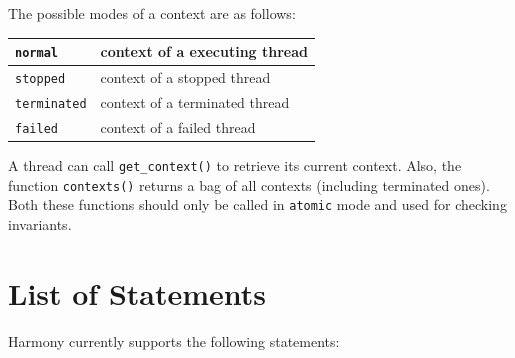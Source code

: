 \documentclass{report}
\begin{document}
The possible modes of a context are as follows:

\begin{center}
\begin{tabular}{|l|l|}
\hline
\texttt{normal} & context of a executing thread \\
\hline
\texttt{stopped} & context of a stopped thread \\
\hline
\texttt{terminated} & context of a terminated thread \\
\hline
\texttt{failed} & context of a failed thread \\
\hline
\end{tabular}
\end{center}

A thread can call \texttt{get\_context()} to retrieve its current
context.  Also, the function \texttt{contexts()} returns a
bag of all contexts (including terminated ones).
Both these functions should only be called in \texttt{atomic} mode
and used for checking invariants.

\chapter{List of Statements}

Harmony currently supports the following statements:
\end{document}

